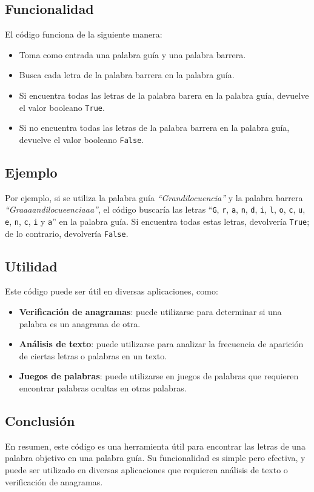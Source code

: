 \documentclass[20pt]{article}
\begin{document}
\subsection*{Funcionalidad}

El código funciona de la siguiente manera:

\begin{itemize}
  \item Toma como entrada una palabra guía y una palabra barrera.
  \item Busca cada letra de la palabra barrera en la palabra guía.
  \item Si encuentra todas las letras de la palabra barera en la palabra guía, devuelve el valor booleano \texttt{True}.
  \item Si no encuentra todas las letras de la palabra barrera en la palabra guía, devuelve el valor booleano \texttt{False}.
\end{itemize}

\subsection*{Ejemplo}

Por ejemplo, si se utiliza la palabra guía \textit{``Grandilocuencia''} y la palabra barrera \textit{``Graaaandilocueenciaaa''}, el código buscaría las letras ``\texttt{G}, \texttt{r}, \texttt{a}, \texttt{n}, \texttt{d}, \texttt{i}, \texttt{l}, \texttt{o}, \texttt{c}, \texttt{u}, \texttt{e}, \texttt{n}, \texttt{c}, \texttt{i} y \texttt{a}'' en la palabra guía. Si encuentra todas estas letras, devolvería \texttt{True}; de lo contrario, devolvería \texttt{False}.

\subsection*{Utilidad}

Este código puede ser útil en diversas aplicaciones, como:

\begin{itemize}
  \item \textbf{Verificación de anagramas}: puede utilizarse para determinar si una palabra es un anagrama de otra.
  \item \textbf{Análisis de texto}: puede utilizarse para analizar la frecuencia de aparición de ciertas letras o palabras en un texto.
  \item \textbf{Juegos de palabras}: puede utilizarse en juegos de palabras que requieren encontrar palabras ocultas en otras palabras.
\end{itemize}

\subsection*{Conclusión}

En resumen, este código es una herramienta útil para encontrar las letras de una palabra objetivo en una palabra guía. Su funcionalidad es simple pero efectiva, y puede ser utilizado en diversas aplicaciones que requieren análisis de texto o verificación de anagramas.
\end{document}
